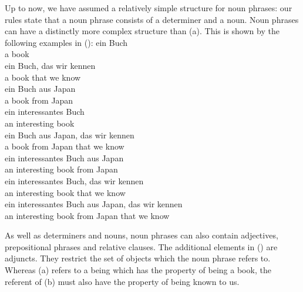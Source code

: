 Up to now, we have assumed a relatively simple structure for noun phrases: our rules state that a noun phrase consists of a determiner and a
noun. Noun phrases can have a distinctly more complex structure than (a). This is shown by the following examples in ():
\eal
\label{Beispiele-NP-Adjunkte}
\ex 
\gll ein Buch\\
     a   book\\
\ex 
\gll ein Buch, das  wir kennen\\
     a   book  that we  know\\
\ex 
\gll ein Buch aus  Japan\\
     a   book from Japan\\
\ex 
\gll ein interessantes Buch\\
     an   interesting   book\\
\ex 
\gll ein Buch aus  Japan, das  wir kennen\\
     a   book from Japan  that we  know\\
\ex 
\gll ein interessantes Buch aus  Japan\\
     an  interesting   book from Japan\\
\ex 
\gll ein interessantes Buch, das  wir kennen\\
     an  interesting   book  that we  know\\
\ex 
\gll ein interessantes Buch aus  Japan, das  wir kennen\\
     an  interesting   book from Japan  that we  know\\
\zl

\noindent
As well as determiners and nouns, noun phrases can also contain adjectives, prepositional phrases and relative clauses. 
The additional elements in () are adjuncts. They restrict the set of objects which the noun phrase 
refers to. Whereas (a) refers to a being which has the property of being a book, the referent of (b) must
also have the property of being known to us.

